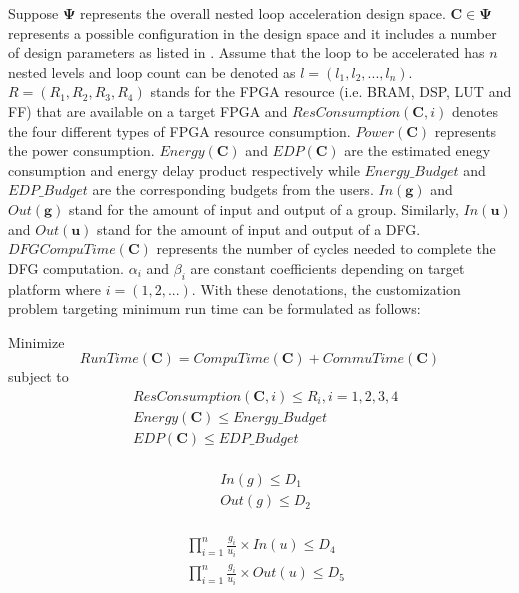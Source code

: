 Suppose $\bm{\Psi}$ represents the overall nested loop acceleration design space. $\bm{C} \in \bm{\Psi}$ represents a possible configuration in the design space and it includes a number of design parameters as listed in . Assume that the loop to be accelerated has $n$ nested levels and loop count can be denoted as $l=(l_1, l_2, ..., l_n)$. $R=(R_1, R_2, R_3, R_4)$ stands for the FPGA resource (i.e. BRAM, DSP, LUT and FF) that are available on a target FPGA and $ResConsumption(\bm{C}, i)$ denotes the four different types of FPGA resource consumption. $Power(\bm{C})$ represents the power consumption. $Energy(\bm{C})$ and $EDP(\bm{C})$ are the estimated enegy consumption and energy delay product respectively while $Energy\_Budget$ and $EDP\_Budget$ are the corresponding budgets from the users. $In(\bm{g})$ and $Out(\bm{g})$ stand for the amount of input and output of a group. Similarly, $In(\bm{u})$ and $Out(\bm{u})$ stand for the amount of input and output of a DFG. $DFGCompuTime(\bm{C})$ represents the number of cycles needed to complete the DFG computation. $\alpha_i$ and $\beta_i$ are constant coefficients depending on target platform where $i=(1,2,...)$. With these denotations, the customization problem targeting minimum run time can be formulated as follows:

Minimize 
\begin{equation} \label{eq:runtime}
    RunTime(\bm{C})=CompuTime(\bm{C})+CommuTime(\bm{C})
\end{equation}
subject to
\begin{equation} \label{eq:constraints1}
    \begin{split}
        &ResConsumption(\bm{C}, i) \leq R_i, i=1,2,3,4 \\
        &Energy(\bm{C}) \leq Energy\_Budget \\
        &EDP(\bm{C}) \leq EDP\_Budget \\
    \end{split}
\end{equation}

\begin{equation} \label{eq:constraints2}
    \begin{split}
        &In(g) \leq D_1\\
        &Out(g) \leq D_2 \\
    \end{split}
\end{equation}

\begin{equation} \label{eq:constraints3}
    \begin{split}
        &\displaystyle \prod_{i=1}^{n} \frac{g_i}{u_i} \times In(u) \leq D_4 \\
        &\displaystyle \prod_{i=1}^{n} \frac{g_i}{u_i} \times Out(u) \leq D_5 \\
    \end{split}
\end{equation}

